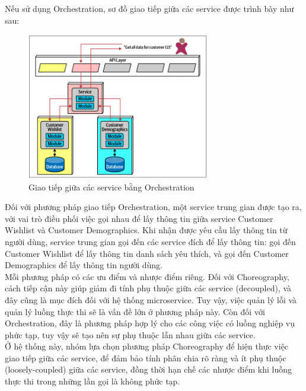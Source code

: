 Nếu sử dụng Orchestration, sơ đồ giao tiếp giữa các service được trình bày như sau:

\begin{figure}[!htp]
	\centering
	\includegraphics[width=8cm]{img/Architecture/orchestration.PNG}
	\newline
	\caption{Giao tiếp giữa các service bằng Orchestration \cite{archOrchestration}}
\end{figure}
Đối với phương pháp giao tiếp Orchestration, một service trung gian được tạo ra, với vai trò điều phối việc gọi nhau để lấy thông tin giữa service Customer Wishlist và Customer Demographics. Khi nhận được yêu cầu lấy thông tin từ người dùng, service trung gian gọi đến các service đích để lấy thông tin: gọi đến Customer Wishlist để lấy thông tin danh sách yêu thích, và gọi đến Customer Demographics để lấy thông tin người dùng.\\

Mỗi phương pháp có các ưu điểm và nhược điểm riêng. Đối với Choreography, cách tiếp cận này giúp giảm đi tính phụ thuộc giữa các service (decoupled), và đây cũng là mục đích đối với hệ thống microservice. Tuy vậy, việc quản lý lỗi và quản lý luồng thực thi sẽ là vấn đề lớn ở phương pháp này. Còn đối với Orchestration, đây là phương pháp hợp lý cho các công việc có luồng nghiệp vụ phức tạp, tuy vậy sẽ tạo nên sự phụ thuộc lẫn nhau giữa các service.\\

Ở hệ thống này, nhóm lựa chọn phương pháp Choreography để hiện thực việc giao tiếp giữa các service, để đảm bảo tính phân chia rõ ràng và ít phụ thuộc (loosely-coupled) giữa các service, đồng thời hạn chế các nhược điểm khi luồng thực thi trong những lần gọi là không phức tạp.

